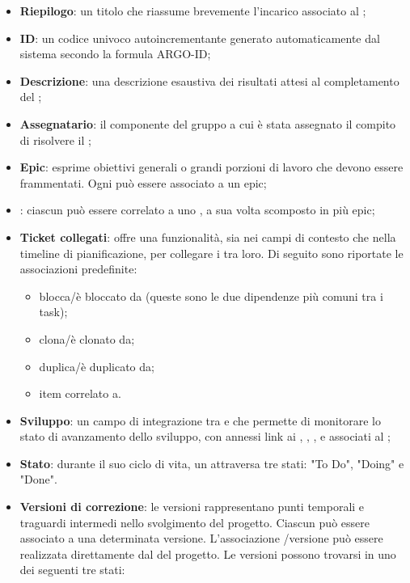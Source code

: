 \begin{itemize}
  \item \textbf{Riepilogo}: un titolo che riassume brevemente l'incarico associato al ;
  \item \textbf{ID}: un codice univoco autoincrementante generato automaticamente dal sistema secondo la formula ARGO-ID;
  \item \textbf{Descrizione}: una descrizione esaustiva dei risultati attesi al completamento del ;
  \item \textbf{Assegnatario}: il componente del gruppo a cui è stata assegnato il compito di risolvere il ;
  \item \textbf{Epic}: esprime obiettivi generali o grandi porzioni di lavoro che devono essere frammentati. Ogni  può essere associato a un epic;
  \item \textbf{}: ciascun  può essere correlato a uno , a sua volta scomposto in più epic;
  \item \textbf{Ticket collegati}:  offre una funzionalità, sia nei campi di contesto che nella timeline di pianificazione, per collegare i  tra loro. Di seguito sono riportate le associazioni predefinite:
    \begin{itemize}
      \item blocca/è bloccato da (queste sono le due dipendenze più comuni tra i task);
      \item clona/è clonato da;
      \item duplica/è duplicato da;
      \item item correlato a.
    \end{itemize}
  \item \textbf{Sviluppo}: un campo di integrazione tra  e  che permette di monitorare lo stato di avanzamento dello sviluppo, con annessi link ai , , ,  e  associati al ;
  \item \textbf{Stato}: durante il suo ciclo di vita, un  attraversa tre stati: "To Do", "Doing" e "Done".
  \item \textbf{Versioni di correzione}: le versioni rappresentano punti temporali e traguardi intermedi nello svolgimento del progetto. Ciascun  può essere associato a una determinata versione. L'associazione /versione può essere realizzata direttamente dal  del progetto. Le versioni possono trovarsi in uno dei seguenti tre stati:

\end{itemize}

